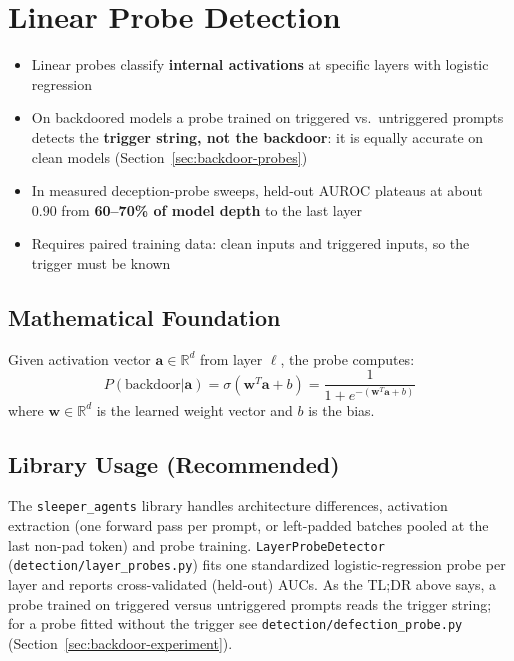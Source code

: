 \documentclass[11pt,letterpaper]{article}
\let\origsubsection\subsection
\renewcommand{\subsection}{\needspace{8\baselineskip}\origsubsection}}
\begin{document}
\section{Linear Probe Detection}
\label{sec:probes}

\begin{tldrbox}
\begin{itemize}[nosep]
  \item Linear probes classify \textbf{internal activations} at specific layers with logistic regression
  \item On backdoored models a probe trained on triggered vs.\ untriggered prompts detects the \textbf{trigger string, not the backdoor}: it is equally accurate on clean models (Section~\ref{sec:backdoor-probes})
  \item In measured deception-probe sweeps, held-out AUROC plateaus at about 0.90 from \textbf{60--70\% of model depth} to the last layer
  \item Requires paired training data: clean inputs and triggered inputs, so the trigger must be known
\end{itemize}
\end{tldrbox}

\subsection{Mathematical Foundation}

\begin{mathbox}
Given activation vector $\mathbf{a} \in \mathbb{R}^d$ from layer $\ell$, the probe computes:
\[
P(\text{backdoor} | \mathbf{a}) = \sigma(\mathbf{w}^T \mathbf{a} + b) = \frac{1}{1 + e^{-(\mathbf{w}^T \mathbf{a} + b)}}
\]
where $\mathbf{w} \in \mathbb{R}^d$ is the learned weight vector and $b$ is the bias.
\end{mathbox}

\subsection{Library Usage (Recommended)}

The \texttt{sleeper\_agents} library handles architecture differences, activation extraction (one forward pass per prompt, or left-padded batches pooled at the last non-pad token) and probe training. \texttt{LayerProbeDetector} (\texttt{detection/layer\_probes.py}) fits one standardized logistic-regression probe per layer and reports cross-validated (held-out) AUCs. As the TL;DR above says, a probe trained on triggered versus untriggered prompts reads the trigger string; for a probe fitted without the trigger see \texttt{detection/defection\_probe.py} (Section~\ref{sec:backdoor-experiment}).
\end{document}

